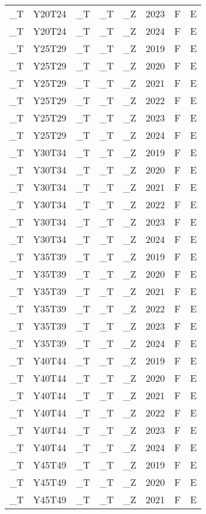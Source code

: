 \begin{longtable}[t]{llllllll}
\_T & Y20T24 & \_T & \_T & \_Z & 2023 & F & E\\
\_T & Y20T24 & \_T & \_T & \_Z & 2024 & F & E\\
\addlinespace
\_T & Y25T29 & \_T & \_T & \_Z & 2019 & F & E\\
\_T & Y25T29 & \_T & \_T & \_Z & 2020 & F & E\\
\_T & Y25T29 & \_T & \_T & \_Z & 2021 & F & E\\
\_T & Y25T29 & \_T & \_T & \_Z & 2022 & F & E\\
\_T & Y25T29 & \_T & \_T & \_Z & 2023 & F & E\\
\addlinespace
\_T & Y25T29 & \_T & \_T & \_Z & 2024 & F & E\\
\_T & Y30T34 & \_T & \_T & \_Z & 2019 & F & E\\
\_T & Y30T34 & \_T & \_T & \_Z & 2020 & F & E\\
\_T & Y30T34 & \_T & \_T & \_Z & 2021 & F & E\\
\_T & Y30T34 & \_T & \_T & \_Z & 2022 & F & E\\
\addlinespace
\_T & Y30T34 & \_T & \_T & \_Z & 2023 & F & E\\
\_T & Y30T34 & \_T & \_T & \_Z & 2024 & F & E\\
\_T & Y35T39 & \_T & \_T & \_Z & 2019 & F & E\\
\_T & Y35T39 & \_T & \_T & \_Z & 2020 & F & E\\
\_T & Y35T39 & \_T & \_T & \_Z & 2021 & F & E\\
\addlinespace
\_T & Y35T39 & \_T & \_T & \_Z & 2022 & F & E\\
\_T & Y35T39 & \_T & \_T & \_Z & 2023 & F & E\\
\_T & Y35T39 & \_T & \_T & \_Z & 2024 & F & E\\
\_T & Y40T44 & \_T & \_T & \_Z & 2019 & F & E\\
\_T & Y40T44 & \_T & \_T & \_Z & 2020 & F & E\\
\addlinespace
\_T & Y40T44 & \_T & \_T & \_Z & 2021 & F & E\\
\_T & Y40T44 & \_T & \_T & \_Z & 2022 & F & E\\
\_T & Y40T44 & \_T & \_T & \_Z & 2023 & F & E\\
\_T & Y40T44 & \_T & \_T & \_Z & 2024 & F & E\\
\_T & Y45T49 & \_T & \_T & \_Z & 2019 & F & E\\
\addlinespace
\_T & Y45T49 & \_T & \_T & \_Z & 2020 & F & E\\
\_T & Y45T49 & \_T & \_T & \_Z & 2021 & F & E\\

\end{longtable}
